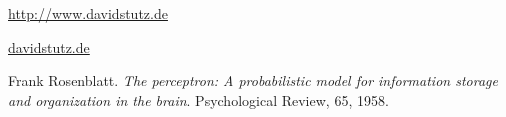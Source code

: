 \documentclass[11pt,a4paper]{article}
\begin{document}
	\noindent\cite{Rosenblatt58}
	
	\noindent \url{http://www.davidstutz.de}
	
	\noindent \href{http://www.davidstutz.de}{davidstutz.de}
	
	\begin{thebibliography}{9}

  		Frank Rosenblatt.
  		\emph{The perceptron: A probabilistic model for information storage and organization in the brain}.
  		Psychological Review, 65, 1958.


	\end{thebibliography}
\end{document}
